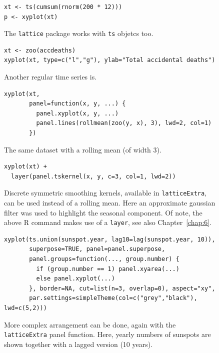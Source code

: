 \documentclass[a4paper,twoside]{book}
\newcounter{fig}
\newcommand{\img}[1]{\texttt{[image: \#1]}\stepcounter{fig}}
\renewcommand{\texttt}[1]{\lstinline{#1}}
\newcommand{\R}{\textsf{R}\xspace}
\begin{document}
\begin{figure}[H]
\begin{lstlisting}
xt <- ts(cumsum(rnorm(200 * 12)))
p <- xyplot(xt)
\end{lstlisting}
  \fcapside[\FBwidth] {\img{figs_lattice-crop}}
  {\caption*{The \texttt{lattice} package works with \texttt{ts}
      objetcs too.}}
\end{figure}

\begin{figure}[H]
\begin{lstlisting}
xt <- zoo(accdeaths)
xyplot(xt, type=c("l","g"), ylab="Total accidental deaths")
\end{lstlisting}
  \fcapside[\FBwidth] {\img{figs_lattice-crop}}
  {\caption*{
      Another regular time series is.}}
\end{figure}

\begin{figure}[H]
\begin{lstlisting}
xyplot(xt,
       panel=function(x, y, ...) {
         panel.xyplot(x, y, ...)
         panel.lines(rollmean(zoo(y, x), 3), lwd=2, col=1)
       })
\end{lstlisting}
  \fcapside[\FBwidth] {\img{figs_lattice-crop}}
  {\caption*{The same dataset with a rolling mean (of width 3).}}
\end{figure}

\begin{figure}[H]
\begin{lstlisting}
xyplot(xt) +
  layer(panel.tskernel(x, y, c=3, col=1, lwd=2))
\end{lstlisting}
  \fcapside[\FBwidth] {\img{figs_lattice-crop}}
  {\caption*{Discrete symmetric smoothing kernels, available in
      \texttt{latticeExtra}, can be used instead of a rolling
      mean. Here an approximate gaussian filter was used to highlight
      the seasonal component. Of note, the above \R command makes use of a
      \texttt{layer}, see also Chapter~\ref{chap:6}.}}
\end{figure}

\begin{figure}[H]
\begin{lstlisting}
xyplot(ts.union(sunspot.year, lag10=lag(sunspot.year, 10)), 
       superpose=TRUE, panel=panel.superpose,
       panel.groups=function(..., group.number) {
         if (group.number == 1) panel.xyarea(...)
         else panel.xyplot(...)
       }, border=NA, cut=list(n=3, overlap=0), aspect="xy",
       par.settings=simpleTheme(col=c("grey","black"), lwd=c(5,2)))
\end{lstlisting}
  \fcapside[\FBwidth] {\img{figs_lattice-crop}}
  {\caption*{ More complex arrangement can be done,
      again with the \texttt{latticeExtra} panel function. Here,
      yearly numbers of sunspots are shown together with a lagged
      version (10 years).}}
\end{figure}
\end{document}
